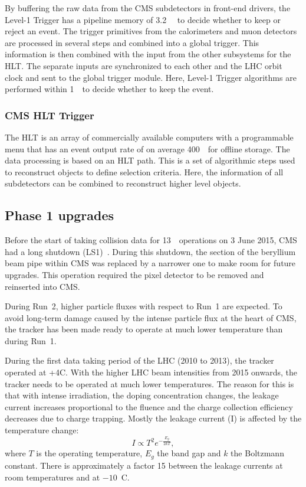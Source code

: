By buffering the raw data from the CMS subdetectors in front-end drivers, the Level-1 Trigger has a pipeline memory of 3.2~ \micro \second\ to decide whether to keep or reject an event. 
The trigger primitives from the calorimeters and muon detectors are processed in several steps and combined into a global trigger. This information is then combined with the input from the other subsystems for the HLT. The separate inputs are synchronized to each other and the LHC orbit clock and sent to the global trigger module. Here, Level-1 Trigger algorithms are performed within 1~\micro \second\ to decide whether to  keep the event. 


\subsubsection*{CMS HLT Trigger}
The HLT is an array of commercially available computers with a programmable menu that has an event output rate of on average 400~\hertz\ for offline storage.
The data processing is based on an HLT path. This is a  set of algorithmic steps used to reconstruct objects to define selection criteria.  Here, the information of all subdetectors can be combined to reconstruct higher level  objects. 

\subsection{Phase 1 upgrades}
\label{sec:Phase1}
Before the start of taking collision data for 13~\TeV\ operations on 3 June 2015, CMS had a long shutdown (LS1)~\cite{Pralavorio:2024977}. During this shutdown, the section of the beryllium beam pipe within CMS was replaced by a narrower one to make room for future upgrades. This operation required the pixel detector to be  removed and reinserted into CMS. 

During Run~2, higher particle fluxes with respect to Run~1 are expected. To avoid long-term damage caused by the intense particle flux at the heart of CMS, the tracker has been made ready to operate at much lower temperature than during Run~1.  


 During the first data taking period of the LHC (2010 to 2013), the tracker operated at +4\degree C. With the higher LHC beam intensities from 2015 onwards, the tracker needs to be operated at much lower temperatures. The reason for this is that with intense irradiation, the doping concentration changes, the leakage current increases proportional to the fluence and the charge collection efficiency decreases due to charge trapping. Mostly the leakage current (I) is affected by the temperature change: 
\begin{equation}
I \propto T^2 e^{-\frac{E_g}{2kT}}, 
\end{equation}
where $T$ is the operating temperature, $E_g$ the band gap and $k$ the Boltzmann constant. There is approximately a factor 15 between the leakage currents at room temperatures and at $-10$~\degree C. 

